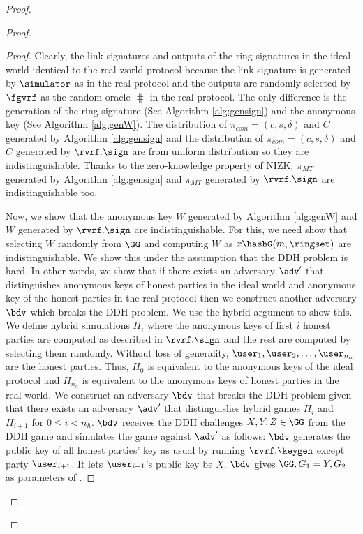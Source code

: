 \begin{proof}
\begin{proof}
		\begin{proof}
			Clearly, the link signatures and outputs of the ring signatures in the ideal world identical to the real world protocol because the link signature is generated by $ \simulator $ as in the real protocol and the outputs are randomly selected by $ \fgvrf $ as the random oracle $ \hash $ in the real protocol. The only difference is the generation of the ring signature (See Algorithm \ref{alg:gensign}) and the anonymous key (See Algorithm \ref{alg:genW}). The distribution of $ \pi_{com} = (c,s,\delta) $ and $ C $ generated by Algorithm \ref{alg:gensign} and the distribution of $ \pi_{com} = (c,s,\delta) $ and $ C $ generated by $ \rvrf.\sign $ are from uniform distribution so they are indistinguishable. Thanks to the zero-knowledge property of NIZK, $ \pi_{MT} $ generated by Algorithm \ref{alg:gensign} and $ \pi_{MT} $ generated by $ \rvrf.\sign $ are indistinguishable too.  
			
			Now, we show that the anonymous key $ W $ generated by Algorithm \ref{alg:genW} and $	 W $ generated by $ \rvrf.\sign $ are indistinguishable. For this,  we need show that selecting $ W $ randomly from $ \GG $ and computing $ W $ as $x \hashG(m, \ringset) $ are indistinguishable.
			We  show this under the assumption that the DDH problem  is hard.  In other words, we show that if there exists an adversary $ \adv' $ that distinguishes anonymous keys of honest parties in the ideal world and anonymous key of the honest parties in the real protocol then we construct another adversary $ \bdv $ which breaks the DDH problem. 
			We use the hybrid argument to show this.
			We define hybrid simulations $ H_{i} $ where  the anonymous keys of first $ i $ honest parties are computed as described in $ \rvrf.\sign $ and the rest are computed by selecting them randomly. Without loss of generality, $ \user_1, \user_2, \ldots, \user_{n_h} $ are the honest parties. Thus, $ H_0 $ is equivalent to the anonymous keys of the ideal protocol  and $ H_{n_h}  $ is equivalent to the anonymous keys of honest parties in the real world.  We construct an adversary $ \bdv $ that breaks the DDH problem given that there exists an adversary $ \adv' $ that distinguishes hybrid games $ H_i $ and $ H_{i + 1} $ for $ 0 \leq i < n_h $. $\bdv $ receives the DDH challenges $ X,Y, Z \in \GG $ from the DDH game and simulates the game against $ \adv' $ as follows: $\bdv $ generates the public key of all  honest parties' key as usual by running $ \rvrf.\keygen$ except party $ \user_{i+1} $. It lets $ \user_{i+1} $'s public key be $ X $. $ \bdv $ gives $ \GG, G_1 = Y, G_2 $ as parameters of \name. 
			

\end{proof}
\end{proof}
\end{proof}
